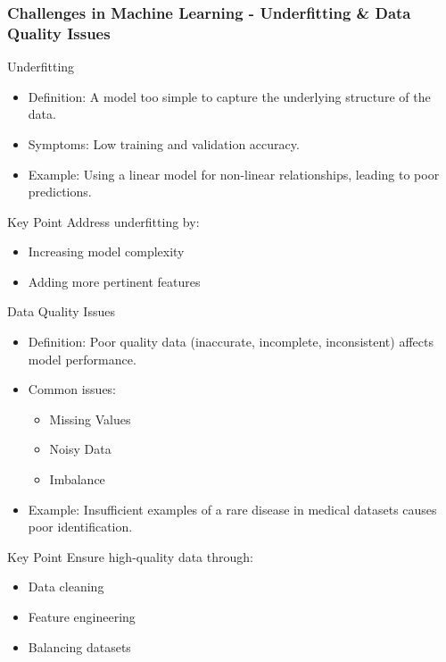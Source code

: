 \documentclass[aspectratio=169]{beamer}
\begin{document}
\begin{frame}[fragile]
    \frametitle{Challenges in Machine Learning - Underfitting & Data Quality Issues}
    \begin{block}{Underfitting}
        \begin{itemize}
            \item Definition: A model too simple to capture the underlying structure of the data.
            \item Symptoms: Low training and validation accuracy.
            \item Example: Using a linear model for non-linear relationships, leading to poor predictions.
        \end{itemize}
        \begin{block}{Key Point}
            Address underfitting by:
            \begin{itemize}
                \item Increasing model complexity
                \item Adding more pertinent features
            \end{itemize}
        \end{block}
    \end{block}
    \begin{block}{Data Quality Issues}
        \begin{itemize}
            \item Definition: Poor quality data (inaccurate, incomplete, inconsistent) affects model performance.
            \item Common issues:
            \begin{itemize}
                \item Missing Values
                \item Noisy Data
                \item Imbalance
            \end{itemize}
            \item Example: Insufficient examples of a rare disease in medical datasets causes poor identification.
        \end{itemize}
    \end{block}
    \begin{block}{Key Point}
        Ensure high-quality data through:
        \begin{itemize}
            \item Data cleaning
            \item Feature engineering
            \item Balancing datasets
        \end{itemize}
    \end{block}
\end{frame}
\end{document}

